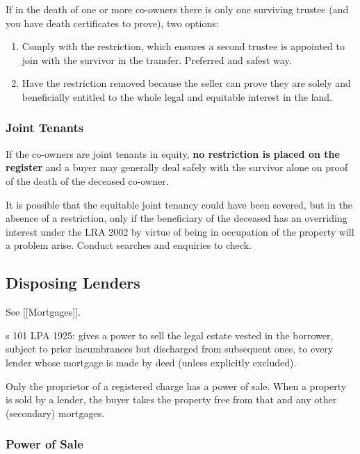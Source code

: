 \documentclass[
]{article}
\providecommand{\tightlist}{%
  \setlength{\itemsep}{0pt}\setlength{\parskip}{0pt}}
\begin{document}
If in the death of one or more co-owners there is only one surviving
trustee (and you have death certificates to prove), two options:

\begin{enumerate}
\def\labelenumi{\arabic{enumi}.}
\tightlist
\item
  Comply with the restriction, which ensures a second trustee is
  appointed to join with the survivor in the transfer. Preferred and
  safest way.
\item
  Have the restriction removed because the seller can prove they are
  solely and beneficially entitled to the whole legal and equitable
  interest in the land.
\end{enumerate}

\hypertarget{joint-tenants}{%
\subsubsection{Joint Tenants}\label{joint-tenants}}

If the co-owners are joint tenants in equity, \textbf{no restriction is
placed on the register} and a buyer may generally deal safely with the
survivor alone on proof of the death of the deceased co-owner.

It is possible that the equitable joint tenancy could have been severed,
but in the absence of a restriction, only if the beneficiary of the
deceased has an overriding interest under the LRA 2002 by virtue of
being in occupation of the property will a problem arise. Conduct
searches and enquiries to check.

\hypertarget{disposing-lenders}{%
\subsection{Disposing Lenders}\label{disposing-lenders}}

See {[}{[}Mortgages{]}{]}.

s 101 LPA 1925: gives a power to sell the legal estate vested in the
borrower, subject to prior incumbrances but discharged from subsequent
ones, to every lender whose mortgage is made by deed (unless explicitly
excluded).

Only the proprietor of a registered charge has a power of sale. When a
property is sold by a lender, the buyer takes the property free from
that and any other (secondary) mortgages.

\hypertarget{power-of-sale}{%
\subsubsection{Power of Sale}\label{power-of-sale}}
\end{document}
